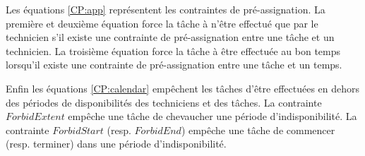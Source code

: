 Les équations \ref{CP:app} représentent les contraintes de pré-assignation.
La première et deuxième équation force la tâche à n'être effectué que par le technicien s'il existe une contrainte de pré-assignation entre une tâche et un technicien.
La troisième équation force la tâche à être effectuée au bon temps lorsqu'il existe une contrainte de pré-assignation entre une tâche et un temps. 

Enfin les équations \ref{CP:calendar} empêchent les tâches d'être effectuées en dehors des périodes de disponibilités des techniciens et des tâches.
La contrainte $ForbidExtent$ empêche une tâche de chevaucher une période d'indisponibilité.
La contrainte $ForbidStart$ (resp. $ForbidEnd$) empêche une tâche de commencer (resp. terminer) dans une période d'indisponibilité.




